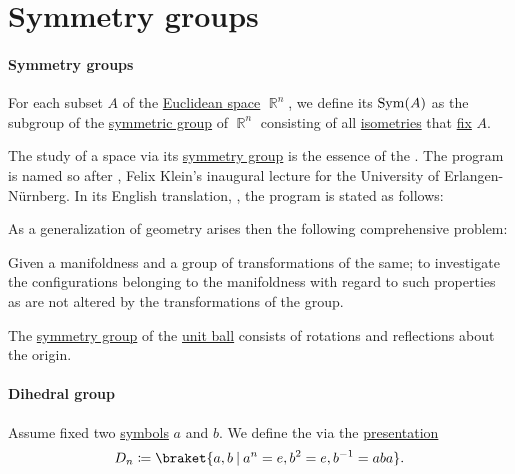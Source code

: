 \section{Symmetry groups}\label{sec:symmetry_groups}

\paragraph{Symmetry groups}

\begin{definition}\label{def:symmetry_group}
  For each subset \( A \) of the \hyperref[def:euclidean_space]{Euclidean space} \( \BbbR^n \), we define its  \( \op{Sym}(A) \) as the subgroup of the \hyperref[def:symmetric_group]{symmetric group} of \( \BbbR^n \) consisting of all \hyperref[def:isometry]{isometries} that \hyperref[def:function_fixed_point]{fix} \( A \).
\end{definition}

\begin{remark}\label{rem:erlangen_program}
  The study of a space via its \hyperref[def:symmetry_group]{symmetry group} is the essence of the . The program is named so after \cite{Klein1893ErlangenProgram}, Felix Klein's inaugural lecture for the University of Erlangen-N\"urnberg. In its English translation, \cite[218]{Klein1893ErlangenProgramEnglish}, the program is stated as follows:
  \begin{displayquote}
    As a generalization of geometry arises then the following comprehensive problem:
    \begin{displayquote}
      Given a manifoldness and a group of transformations of the same; to investigate the configurations belonging to the manifoldness with regard to such properties as are not altered by the transformations of the group.
    \end{displayquote}
  \end{displayquote}
\end{remark}

\begin{proposition}\label{thm:symmetry_group_of_sphere}
  The \hyperref[def:symmetry_group]{symmetry group} of the \hyperref[def:metric_space/ball]{unit ball} consists of rotations and reflections about the origin.
\end{proposition}

\paragraph{Dihedral group}

\begin{definition}\label{def:dihedral_group}
  Assume fixed two \hyperref[def:formal_language/symbol]{symbols} \( a \) and \( b \). We define the  via the \hyperref[def:group_presentation]{presentation}
  \begin{equation}\label{eq:def:dihedral_group}
    D_n \coloneqq \braket{ a, b \given a^n = e, b^2 = e, b^{-1} = aba }.
  \end{equation}
\end{definition}
